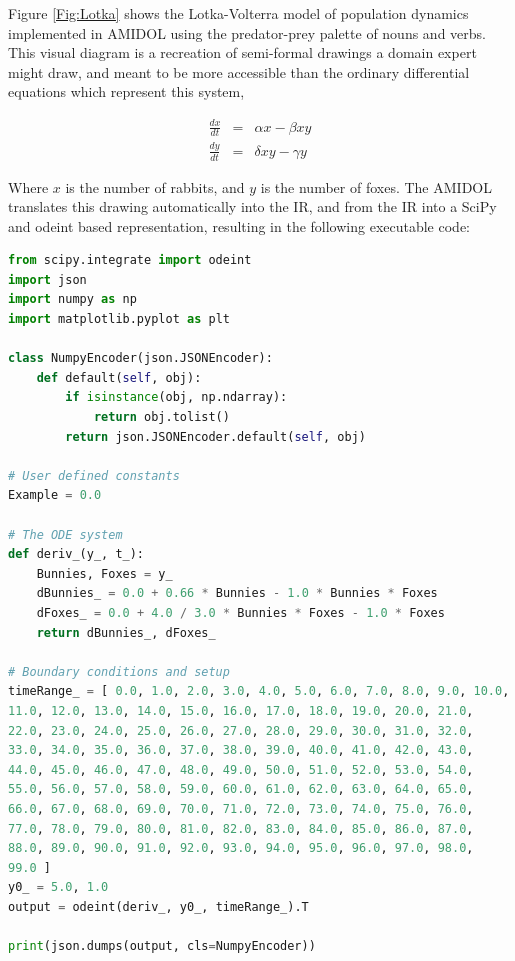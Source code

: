\documentclass[11pt]{article}
\newcommand{\amidol}{\textsc{AMIDOL}}
\begin{document}
Figure \ref{Fig:Lotka} shows the Lotka-Volterra model of population dynamics implemented in \amidol{} using the predator-prey palette of nouns and verbs.  This visual diagram is a recreation of semi-formal drawings a domain expert might draw, and meant to be more accessible than the ordinary differential equations which represent this system,

\begin{eqnarray}
  \frac{dx}{dt} &=& \alpha x - \beta x y\\
  \frac{dy}{dt} &=& \delta x y - \gamma y
\end{eqnarray}

Where $x$ is the number of rabbits, and $y$ is the number of foxes.  The \amidol{} translates this drawing automatically into the IR, and from the IR into a SciPy and odeint based representation, resulting in the following executable code:

\begin{lstlisting}[language=python]
  from scipy.integrate import odeint
import json
import numpy as np
import matplotlib.pyplot as plt

class NumpyEncoder(json.JSONEncoder):
    def default(self, obj):
        if isinstance(obj, np.ndarray):
            return obj.tolist()
        return json.JSONEncoder.default(self, obj)

# User defined constants
Example = 0.0

# The ODE system
def deriv_(y_, t_):
    Bunnies, Foxes = y_
    dBunnies_ = 0.0 + 0.66 * Bunnies - 1.0 * Bunnies * Foxes
    dFoxes_ = 0.0 + 4.0 / 3.0 * Bunnies * Foxes - 1.0 * Foxes
    return dBunnies_, dFoxes_

# Boundary conditions and setup
timeRange_ = [ 0.0, 1.0, 2.0, 3.0, 4.0, 5.0, 6.0, 7.0, 8.0, 9.0, 10.0,
11.0, 12.0, 13.0, 14.0, 15.0, 16.0, 17.0, 18.0, 19.0, 20.0, 21.0,
22.0, 23.0, 24.0, 25.0, 26.0, 27.0, 28.0, 29.0, 30.0, 31.0, 32.0,
33.0, 34.0, 35.0, 36.0, 37.0, 38.0, 39.0, 40.0, 41.0, 42.0, 43.0,
44.0, 45.0, 46.0, 47.0, 48.0, 49.0, 50.0, 51.0, 52.0, 53.0, 54.0,
55.0, 56.0, 57.0, 58.0, 59.0, 60.0, 61.0, 62.0, 63.0, 64.0, 65.0,
66.0, 67.0, 68.0, 69.0, 70.0, 71.0, 72.0, 73.0, 74.0, 75.0, 76.0,
77.0, 78.0, 79.0, 80.0, 81.0, 82.0, 83.0, 84.0, 85.0, 86.0, 87.0,
88.0, 89.0, 90.0, 91.0, 92.0, 93.0, 94.0, 95.0, 96.0, 97.0, 98.0,
99.0 ]
y0_ = 5.0, 1.0
output = odeint(deriv_, y0_, timeRange_).T

print(json.dumps(output, cls=NumpyEncoder))
\end{lstlisting}
\end{document}
